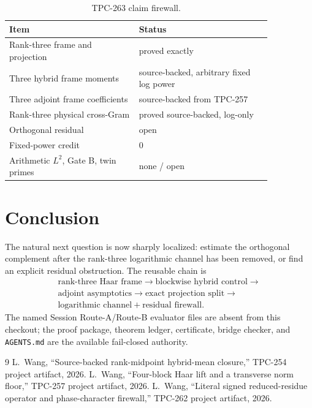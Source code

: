 \documentclass[11pt]{article}
\begin{document}
\begin{table}[t]
\centering
\caption{TPC-263 claim firewall.}
\begin{tabular}{p{0.42\linewidth}p{0.43\linewidth}}
\toprule
Item & Status\\
\midrule
Rank-three frame and projection & proved exactly\\
Three hybrid frame moments & source-backed, arbitrary fixed log power\\
Three adjoint frame coefficients & source-backed from TPC-257\\
Rank-three physical cross-Gram & proved source-backed, log-only\\
Orthogonal residual & open\\
Fixed-power credit & 0\\
Arithmetic \(L^2\), Gate B, twin primes & none / open\\
\bottomrule
\end{tabular}
\end{table}

\section{Conclusion}
The natural next question is now sharply localized: estimate the orthogonal
complement after the rank-three logarithmic channel has been removed, or find
an explicit residual obstruction.  The reusable chain is
\[
\begin{gathered}
 \text{rank-three Haar frame}\to\text{blockwise hybrid control}\to\\
 \text{adjoint asymptotics}\to\text{exact projection split}\to\\
 \text{logarithmic channel}+\text{residual firewall}.
\end{gathered}
\]
The named Session Route-A/Route-B evaluator files are absent from this
checkout; the proof package, theorem ledger, certificate, bridge checker, and
\texttt{AGENTS.md} are the available fail-closed authority.

\begin{thebibliography}{9}
 L.~Wang, ``Source-backed rank-midpoint hybrid-mean closure,''
TPC-254 project artifact, 2026.
 L.~Wang, ``Four-block Haar lift and a transverse norm floor,''
TPC-257 project artifact, 2026.
 L.~Wang, ``Literal signed reduced-residue operator and
phase-character firewall,'' TPC-262 project artifact, 2026.
\end{thebibliography}
\end{document}
